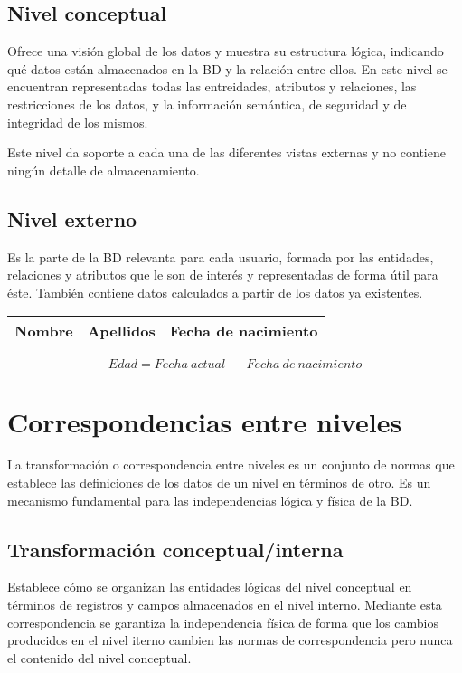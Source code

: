 \subsection{Nivel conceptual}

Ofrece una visión global de los datos y muestra su estructura lógica, indicando qué datos están almacenados en la BD y la relación entre ellos.
En este nivel se encuentran representadas todas las entreidades, atributos y relaciones, las restricciones de los datos, y la información semántica, de seguridad y de integridad de los mismos.

Este nivel da soporte a cada una de las diferentes vistas externas y no contiene ningún detalle de almacenamiento.

\subsection{Nivel externo}

Es la parte de la BD relevanta para cada usuario, formada por las entidades, relaciones y atributos que le son de interés y representadas de forma útil para éste.
También contiene datos calculados a partir de los datos ya existentes.

\begin{center}
\begin{tabular}{| l | l | l |}
\midrule
Nombre & Apellidos & Fecha de nacimiento \\
\midrule
\end{tabular}
\[Edad=Fecha\ actual\ -\ Fecha\ de\ nacimiento\]
\end{center}

\section{Correspondencias entre niveles}

La transformación o correspondencia entre niveles es un conjunto de normas que establece las definiciones de los datos de un nivel en términos de otro.
Es un mecanismo fundamental para las independencias lógica y física de la BD\@.

\subsection{Transformación conceptual/interna}

Establece cómo se organizan las entidades lógicas del nivel conceptual en términos de registros y campos almacenados en el nivel interno.
Mediante esta correspondencia se garantiza la independencia física de forma que los cambios producidos en el nivel iterno cambien las normas de correspondencia pero nunca el contenido del nivel conceptual.

